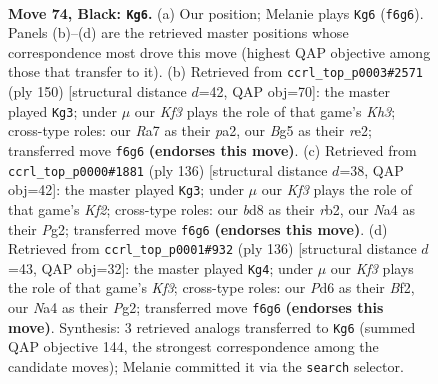 \documentclass[11pt]{article}
\begin{document}
\clearpage

\begin{figure}[p]\centering
\begin{subfigure}{0.46\textwidth}\centering
\resizebox{\linewidth}{!}{%
\newchessgame
\chessboard[
  setfen={3B4/rB6/3p1k1p/4p1b1/n3P2p/5P1R/4K3/8 b - - 18 74},
  showmover=false,
  pgfstyle=straightmove, color=movearrow, markmove={f6-g6}
]}
\caption{}
\end{subfigure}\hfill
\begin{subfigure}{0.46\textwidth}\centering
\resizebox{\linewidth}{!}{%
\newchessgame
\chessboard[
  setfen={6k1/R7/4P2p/6p1/3B2P1/2P2P1K/p3r3/5b2 w - - 7 76},
  showmover=false,
  pgfstyle=straightmove, color=movearrow, markmove={h3-g3}
]}
\caption{}
\end{subfigure}
\\[4pt]
\begin{subfigure}{0.46\textwidth}\centering
\resizebox{\linewidth}{!}{%
\newchessgame
\chessboard[
  setfen={4R3/5pp1/1P3k2/3bp2p/7P/4BP2/1r3KP1/8 w - - 8 69},
  showmover=false,
  pgfstyle=straightmove, color=movearrow, markmove={f2-g3}
]}
\caption{}
\end{subfigure}\hfill
\begin{subfigure}{0.46\textwidth}\centering
\resizebox{\linewidth}{!}{%
\newchessgame
\chessboard[
  setfen={8/6k1/5bp1/3B4/3P1P1p/r4K1P/5BP1/8 w - - 5 69},
  showmover=false,
  pgfstyle=straightmove, color=movearrow, markmove={f3-g4}
]}
\caption{}
\end{subfigure}
\caption{\textbf{Move 74, Black: \texttt{Kg6}.} (a) Our position; Melanie plays \texttt{Kg6} (\texttt{f6g6}). Panels (b)--(d) are the retrieved master positions whose correspondence most drove this move (highest QAP objective among those that transfer to it). (b) Retrieved from \texttt{ccrl\_top\_p0003\#2571} (ply 150) [structural distance $d$=42, QAP obj=70]: the master played \texttt{Kg3}; under $\mu$ our \emph{Kf3} plays the role of that game's \emph{Kh3}; cross-type roles: our \emph{R}a7 as their \emph{p}a2, our \emph{B}g5 as their \emph{r}e2; transferred move \texttt{f6g6} \textbf{(endorses this move)}. (c) Retrieved from \texttt{ccrl\_top\_p0000\#1881} (ply 136) [structural distance $d$=38, QAP obj=42]: the master played \texttt{Kg3}; under $\mu$ our \emph{Kf3} plays the role of that game's \emph{Kf2}; cross-type roles: our \emph{b}d8 as their \emph{r}b2, our \emph{N}a4 as their \emph{P}g2; transferred move \texttt{f6g6} \textbf{(endorses this move)}. (d) Retrieved from \texttt{ccrl\_top\_p0001\#932} (ply 136) [structural distance $d$=43, QAP obj=32]: the master played \texttt{Kg4}; under $\mu$ our \emph{Kf3} plays the role of that game's \emph{Kf3}; cross-type roles: our \emph{P}d6 as their \emph{B}f2, our \emph{N}a4 as their \emph{P}g2; transferred move \texttt{f6g6} \textbf{(endorses this move)}. Synthesis: 3 retrieved analogs transferred to \texttt{Kg6} (summed QAP objective 144, the strongest correspondence among the candidate moves); Melanie committed it via the \texttt{search} selector.}
\label{fig:thought-m147}
\end{figure}
\end{document}
